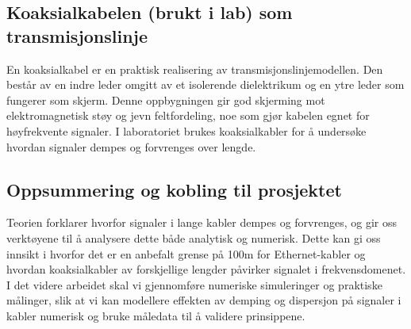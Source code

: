 \subsection{Koaksialkabelen (brukt i lab) som transmisjonslinje}
En koaksialkabel er en praktisk realisering av transmisjonslinjemodellen. Den består av en indre leder omgitt av et isolerende dielektrikum og en ytre leder som fungerer som skjerm. Denne oppbygningen gir god skjerming mot elektromagnetisk støy og jevn feltfordeling, noe som gjør kabelen egnet for høyfrekvente signaler. I laboratoriet brukes koaksialkabler for å undersøke hvordan signaler dempes og forvrenges over lengde.
\subsection{Oppsummering og kobling til prosjektet}
Teorien forklarer hvorfor signaler i lange kabler dempes og forvrenges, og gir oss verktøyene til å analysere dette både analytisk og numerisk. Dette kan gi oss innsikt i hvorfor det er en anbefalt grense på 100m for Ethernet-kabler og hvordan koaksialkabler av forskjellige lengder påvirker signalet i frekvensdomenet. I det videre arbeidet skal vi gjennomføre numeriske simuleringer og praktiske målinger, slik at vi kan modellere effekten av demping og dispersjon på signaler i kabler numerisk og bruke måledata til å validere prinsippene.
